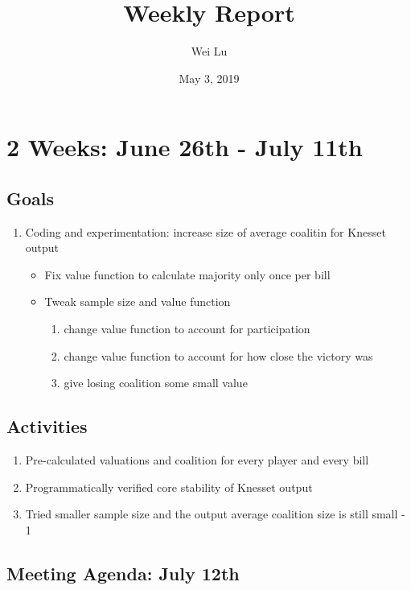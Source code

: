 \documentclass[a4paper]{article}
\title{Weekly Report}
\date{May 3, 2019}
\author{Wei Lu}
\begin{document}
\maketitle

\section*{2 Weeks: June 26th - July 11th}

\subsection*{Goals}

\begin{enumerate}
  \item Coding and experimentation: increase size of average coalitin for Knesset output
  \begin{itemize}
    \item Fix value function to calculate majority only once per bill
    \item Tweak sample size and value function
    \begin{enumerate}
      \item change value function to account for participation
      \item change value function to account for how close the victory was
      \item give losing coalition some small value
    \end{enumerate}
  \end{itemize}
\end{enumerate}

\subsection*{Activities}

\begin{enumerate}
  \item Pre-calculated valuations and coalition for every player and every bill
  \item Programmatically verified core stability of Knesset output
  \item Tried smaller sample size and the output average coalition size is still small - 1
\end{enumerate}

\subsection*{Meeting Agenda: July 12th}
\end{document}
